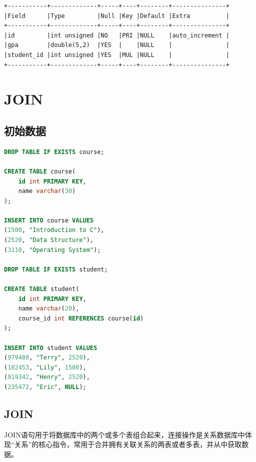 \documentclass[12pt, openany, oneside]{book}
\begin{document}
\begin{tcolorbox}
\begin{verbatim}
+-----------+-------------+-----+----+--------+---------------+
|Field      |Type         |Null |Key |Default |Extra          |
+-----------+-------------+-----+----+--------+---------------+
|id         |int unsigned |NO   |PRI |NULL    |auto_increment |
|gpa        |double(5,2)  |YES  |    |NULL    |               |
|student_id |int unsigned |YES  |MUL |NULL    |               |
+-----------+-------------+-----+----+--------+---------------+
	\end{verbatim}
\end{tcolorbox}

\newpage

\chapter{JOIN}

\section{初始数据}


\begin{lstlisting}[language=SQL]
DROP TABLE IF EXISTS course;

CREATE TABLE course(
    id int PRIMARY KEY,
    name varchar(30)
);

INSERT INTO course VALUES
(1500, "Introduction to C"),
(2520, "Data Structure"),
(3110, "Operating System");

DROP TABLE IF EXISTS student;

CREATE TABLE student(
    id int PRIMARY KEY,
    name varchar(20),
    course_id int REFERENCES course(id)
);

INSERT INTO student VALUES
(979489, "Terry", 2520),
(102453, "Lily", 1500),
(919342, "Henry", 2520),
(235472, "Eric", NULL);
\end{lstlisting}

\vspace{0.5cm}

\section{JOIN}

JOIN语句用于将数据库中的两个或多个表组合起来，连接操作是关系数据库中体现“关系”的核心指令，常用于合并拥有关联关系的两表或者多表，并从中获取数据。\\
\end{document}
